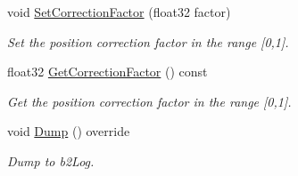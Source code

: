 \begin{DoxyCompactItemize}
\mbox{\label{classb2MotorJoint_ae59e624b8a7b6f869ab5e6148352cb52}} 
void \hyperlink{classb2MotorJoint_ae59e624b8a7b6f869ab5e6148352cb52}{Set\+Correction\+Factor} (float32 factor)
\begin{DoxyCompactList}\small\item\em Set the position correction factor in the range \mbox{[}0,1\mbox{]}. \end{DoxyCompactList}\item 
\mbox{\label{classb2MotorJoint_a429f9656d9f39e6e992de59c9620d6c6}} 
float32 \hyperlink{classb2MotorJoint_a429f9656d9f39e6e992de59c9620d6c6}{Get\+Correction\+Factor} () const
\begin{DoxyCompactList}\small\item\em Get the position correction factor in the range \mbox{[}0,1\mbox{]}. \end{DoxyCompactList}\item 
\mbox{\label{classb2MotorJoint_abb67754f39b4747ae07af5cb5b348836}} 
void \hyperlink{classb2MotorJoint_abb67754f39b4747ae07af5cb5b348836}{Dump} () override
\begin{DoxyCompactList}\small\item\em Dump to b2\+Log. \end{DoxyCompactList}\end{DoxyCompactItemize}
